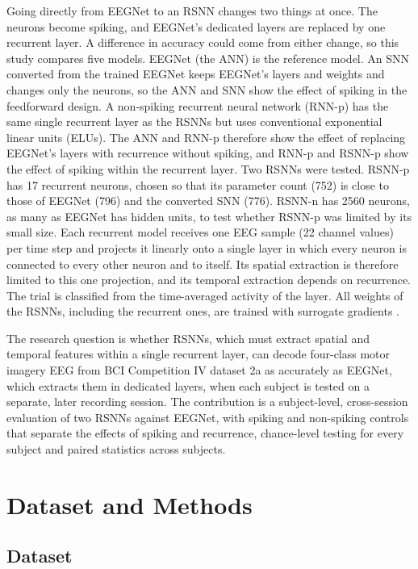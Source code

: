 \documentclass[conference]{IEEEtran}
\begin{document}
Going directly from EEGNet to an RSNN changes two things at once. The neurons become spiking, and EEGNet's dedicated layers are replaced by one recurrent layer. A difference in accuracy could come from either change, so this study compares five models. EEGNet (the ANN) is the reference model. An SNN converted from the trained EEGNet keeps EEGNet's layers and weights and changes only the neurons, so the ANN and SNN show the effect of spiking in the feedforward design. A non-spiking recurrent neural network (RNN-p) has the same single recurrent layer as the RSNNs but uses conventional exponential linear units (ELUs). The ANN and RNN-p therefore show the effect of replacing EEGNet's layers with recurrence without spiking, and RNN-p and RSNN-p show the effect of spiking within the recurrent layer. Two RSNNs were tested. RSNN-p has 17 recurrent neurons, chosen so that its parameter count (752) is close to those of EEGNet (796) and the converted SNN (776). RSNN-n has 2560 neurons, as many as EEGNet has hidden units, to test whether RSNN-p was limited by its small size. Each recurrent model receives one EEG sample (22 channel values) per time step and projects it linearly onto a single layer in which every neuron is connected to every other neuron and to itself. Its spatial extraction is therefore limited to this one projection, and its temporal extraction depends on recurrence. The trial is classified from the time-averaged activity of the layer. All weights of the RSNNs, including the recurrent ones, are trained with surrogate gradients \cite{neftci2019}.

The research question is whether RSNNs, which must extract spatial and temporal features within a single recurrent layer, can decode four-class motor imagery EEG from BCI Competition IV dataset 2a as accurately as EEGNet, which extracts them in dedicated layers, when each subject is tested on a separate, later recording session. The contribution is a subject-level, cross-session evaluation of two RSNNs against EEGNet, with spiking and non-spiking controls that separate the effects of spiking and recurrence, chance-level testing for every subject and paired statistics across subjects.

\section{Dataset and Methods}
\label{sec:methods}

\subsection{Dataset}
\end{document}
